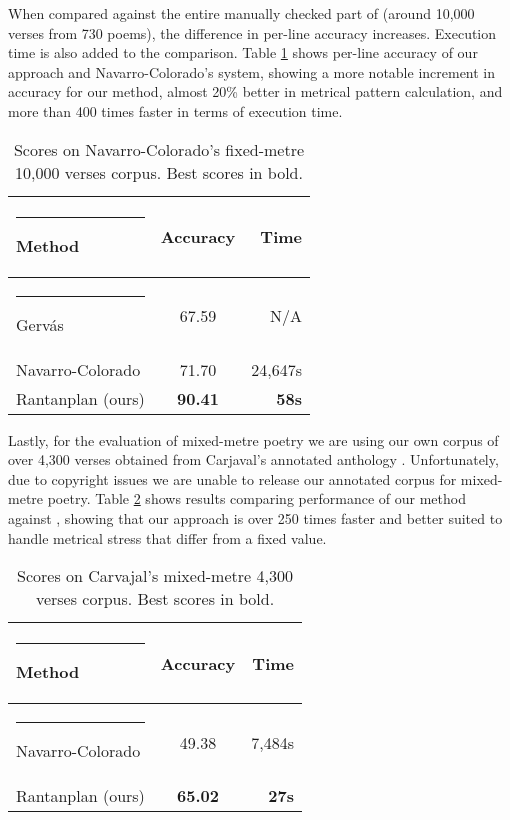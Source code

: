 \documentclass[a4paper,11pt,twocolumn,twoside]{article}
\begin{document}
When compared against the entire manually checked part of \cite{navarro2016metrical} (around 10,000 verses from 730 poems), the difference in per-line accuracy increases. Execution time is also added to the comparison. Table \ref{table.3} shows per-line accuracy of our approach and Navarro-Colorado's system, showing a more notable increment in accuracy for our method, almost 20\% better in metrical pattern calculation, and more than 400 times faster in terms of execution time.

\begin{table} [htbp]
\begin{center}
\begin{tabular} {|l|c|r|}
  \hline\rule{-2pt}{15pt}
  {\bf Method} & {\bf Accuracy} & {\bf Time}\\
  \hline\rule{-4pt}{10pt}
Gervás & 67.59 & N/A \\
Navarro-Colorado & 71.70 & 24,647s \\
Rantanplan (ours) & \textbf{90.41} & \textbf{58s}\\
\hline
\end{tabular}
\end{center}
\caption{\label{table.3}Scores on Navarro-Colorado's fixed-metre 10,000 verses corpus. Best scores in bold.}
\end{table}

Lastly, for the evaluation of mixed-metre poetry we are using our own corpus of over 4,300 verses obtained from Carjaval's annotated anthology \cite{fernandez2003antologia}. Unfortunately, due to copyright issues we are unable to release our annotated corpus for mixed-metre poetry. Table \ref{table.4} shows results comparing performance of our method against \cite{navarro2017metrical}, showing that our approach is over 250 times faster and better suited to handle metrical stress that differ from a fixed value.

\begin{table} [htbp]
\begin{center}
\begin{tabular} {|l|c|r|}
  \hline\rule{-2pt}{15pt}
  {\bf Method} & {\bf Accuracy} & {\bf Time}\\
  \hline\rule{-4pt}{10pt}
Navarro-Colorado & 49.38 & 7,484s \\
Rantanplan (ours) & \textbf{65.02} & \textbf{27s} \\
\hline
\end{tabular}
\end{center}
\caption{\label{table.4}Scores on Carvajal's mixed-metre 4,300 verses corpus. Best scores in bold.}
\end{table}
\end{document}
